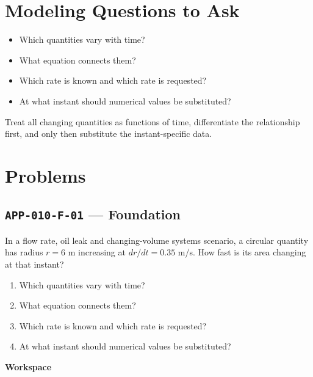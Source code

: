 \documentclass[11pt]{book}
\newcommand{\pid}[1]{\texttt{#1}}
\newcommand{\workspace}{\par\vspace{0.7in}\hrulefill\par\vspace{0.55in}\hrulefill\par}
\begin{document}
\section*{Modeling Questions to Ask}\begin{itemize}
\item Which quantities vary with time?
\item What equation connects them?
\item Which rate is known and which rate is requested?
\item At what instant should numerical values be substituted?
\end{itemize}
\begin{errorbox}Treat all changing quantities as functions of time, differentiate the relationship first, and only then substitute the instant-specific data.\end{errorbox}
\section*{Problems}
\subsection*{\pid{APP-010-F-01} — Foundation}
\begin{problembox}
In a flow rate, oil leak and changing-volume systems scenario, a circular quantity has radius $r=6$ m increasing at $dr/dt=0.35$ m/s. How fast is its area changing at that instant?
\end{problembox}
\begin{promptbox}\begin{enumerate}
\item Which quantities vary with time?
\item What equation connects them?
\item Which rate is known and which rate is requested?
\item At what instant should numerical values be substituted?
\end{enumerate}\end{promptbox}
\textbf{Workspace}\workspace
{}
\end{document}
